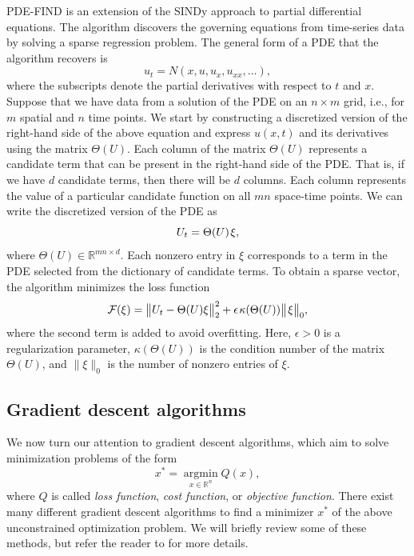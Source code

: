 \documentclass
[
    a4paper,
    DIV=11,
    abstract=true,
    11pt,
]
{scrartcl}
\newcommand{\R}{\mathbb{R}}                                      %
\newcommand{\ts}{\hspace*{0.1em}}                                %
\DeclareMathOperator*{\argmin}{argmin}
\theoremstyle{definition}
\begin{document}
PDE-FIND \cite{rudy2017data} is an extension of the SINDy approach to partial differential equations. The algorithm discovers the governing equations from time-series data by solving a sparse regression problem. The general form of a PDE that the algorithm recovers is
\begin{equation*}
    u_t = N(x, u, u_x, u_{xx}, \dots),
\end{equation*}
where the subscripts denote the partial derivatives with respect to $ t $ and $ x $. Suppose that we have data from a solution of the PDE on an $n \times m$ grid, i.e., for $m$ spatial and $n$ time points. We start by constructing a discretized version of the right-hand side of the above equation and express $u(x, t)$ and its derivatives using the matrix $\Theta(U)$. Each column of the matrix $\Theta(U)$ represents a candidate term that can be present in the right-hand side of the PDE. That is, if we have $d$ candidate terms, then there will be $d$ columns. Each column represents the value of a particular candidate function on all $mn$ space-time points. We can write the discretized version of the PDE as
\begin{equation*}
    U_t = \Theta(U) \ts \xi,
\end{equation*}
where $\Theta(U) \in \R^{mn \times d}$. Each nonzero entry in $\xi$ corresponds to a term in the PDE selected from the dictionary of candidate terms. To obtain a sparse vector, the algorithm minimizes the loss function
\begin{equation*}
    \mathcal{F}(\xi) = \big\| U_t - \Theta(U)\xi \big \|_2^2 + \epsilon \ts \kappa(\Theta(U))\big\| \ts\xi\big\|_0,
\end{equation*}
where the second term is added to avoid overfitting. Here, $\epsilon>0$ is a regularization parameter, $ \kappa(\Theta(U)) $ is the condition number of the matrix $ \Theta(U) $, and $\| \xi \|_0$ is the number of nonzero entries of $\xi$.

\subsection{Gradient descent algorithms}

We now turn our attention to gradient descent algorithms, which aim to solve minimization problems of the form
\begin{equation*}
    x^* = \argmin\limits_{x \in \R^n} Q(x),
\end{equation*}
where $Q$ is called \emph{loss function}, \emph{cost function}, or \emph{objective function}. There exist many different gradient descent algorithms to find a minimizer $x^*$ of the above unconstrained optimization problem. We will briefly review some of these methods, but refer the reader to \cite{lu2022gradient, nesterov2018lectures, robbins1951stochastic, tran2024gradient} for more details.
\end{document}
